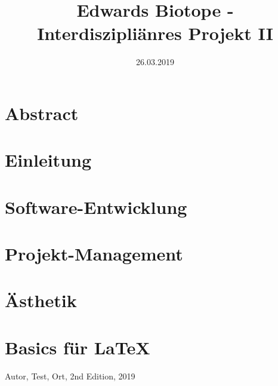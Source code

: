 \documentclass[12pt ,letterpaper]{article}
\title{Edwards Biotope - Interdiszipliänres Projekt II}
\date{26.03.2019}
\begin{document}
\maketitle
\tableofcontents
\pagebreak
\section{Abstract}
\section{Einleitung}
\section{Software-Entwicklung}


\section{Projekt-Management}
\section{Ästhetik} 
\pagebreak
\section{Basics für  \LaTeX}


\pagebreak
\begin{thebibliography}{9}
Autor, Test,
Ort,
2nd Edition,
2019
\end{thebibliography}
\end{document}
